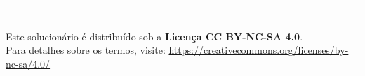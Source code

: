 \documentclass[10pt]{article}
\begin{document}
	\begin{flushleft}
		\begingroup
		\renewcommand{\footnoterule}{\noindent\rule{5cm}{0.4pt}\vspace{2pt}} %
		\footnoterule \\
		\footnotesize %
		Este solucionário é distribuído sob a \textbf{Licença CC BY-NC-SA 4.0}. \\
		Para detalhes sobre os termos, visite: \url{https://creativecommons.org/licenses/by-nc-sa/4.0/}
		\endgroup
	\end{flushleft}
	
	
	\newpage
	\def\listid{L1} %
	\setcounter{numquestao}{0} 
	
	
	\newpage
	\def\listid{L2} %
	\setcounter{numquestao}{0}
	
	
	\newpage
	\def\listid{L3} %
	\setcounter{numquestao}{0}
	
\end{document}
